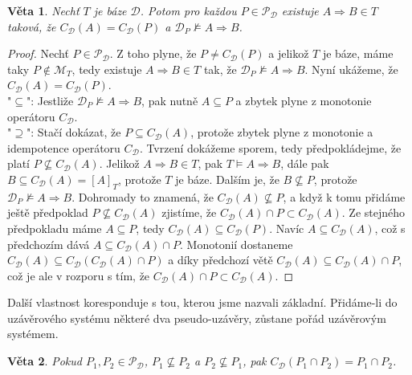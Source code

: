 \documentclass{article}
\newtheorem{theorem}{Věta}
\theoremstyle {definition}
\begin{document}
\begin{theorem}
  Nechť $T$ je báze $\mathcal{D}$. Potom pro každou $P \in \mathcal
  P_{\mathcal{D}}$ existuje $A \Rightarrow B \in T$ taková, že
  $C_{\mathcal{D}}(A) = C_{\mathcal{D}}(P)$ a $\mathcal{D}_P
  \not\models A \Rightarrow B$.
\end{theorem}
\begin{proof}
  Nechť $P \in \mathcal P_{\mathcal{D}}$. Z toho plyne, že $P \neq
  C_{\mathcal{D}}(P)$ a jelikož $T$ je báze, máme taky $P \not\in
  \mathcal{M}_T$, tedy existuje $A \Rightarrow B \in T$ tak, že
  $\mathcal{D}_P \not\models A \Rightarrow B$. Nyní ukážeme, že
  $C_{\mathcal{D}}(A) = C_{\mathcal{D}}(P)$. \\
  
  "$\subseteq$": Jestliže $\mathcal{D}_P \not\models A \Rightarrow B$,
  pak nutně $A\subseteq P$ a zbytek plyne z monotonie operátoru
  $C_{\mathcal{D}}$. \\

  "$\supseteq$": Stačí dokázat, že $P\subseteq C_{\mathcal D}(A)$,
  protože zbytek plyne z monotonie a idempotence operátoru
  $C_{\mathcal D}$. Tvrzení dokážeme sporem, tedy předpokládejme, že
  platí $P\not\subseteq C_{\mathcal D}(A)$. Jelikož $A\Rightarrow B\in
  T$, pak $T\models A\Rightarrow B$, dále pak $B\subseteq
  C_{\mathcal{D}}(A) = [A]_T$, protože $T$ je báze. Dalším je, že
  $B\not\subseteq P$, protože $\mathcal{D}_P \not\models A \Rightarrow
  B$. Dohromady to znamená, že $C_{\mathcal{D}}(A) \not\subseteq P$, a
  když k tomu přidáme ještě předpoklad $P\not\subseteq C_{\mathcal
    D}(A)$ zjistíme, že $C_{\mathcal D}(A) \cap P \subset C_{\mathcal
    D}(A)$. Ze stejného předpokladu máme $A\subseteq P$, tedy
  $C_{\mathcal D}(A)\subseteq C_{\mathcal D}(P)$. Navíc $A \subseteq
  C_{\mathcal D}(A)$, což s předchozím dává $A\subseteq C_{\mathcal
    D}(A) \cap P$. Monotonií dostaneme $C_{\mathcal D}(A)\subseteq
  C_{\mathcal D}(C_{\mathcal D}(A) \cap P)$ a díky předchozí větě
  $C_{\mathcal D}(A)\subseteq C_{\mathcal D}(A) \cap P$, což je ale v
  rozporu s tím, že $C_{\mathcal D}(A) \cap P \subset C_{\mathcal
    D}(A)$.
\end{proof}

Další vlastnost koresponduje s tou, kterou jsme nazvali
základní. Přidáme-li do uzávěrového systému některé dva
pseudo-uzávěry, zůstane pořád uzávěrovým systémem.

\begin{theorem}
  Pokud $P_1, P_2 \in \mathcal P_{\mathcal{D}}$, $P_1 \not\subseteq
  P_2$ a $P_2 \not\subseteq P_1$, pak $C_{\mathcal{D}} (P_1 \cap P_2)
  = P_1 \cap P_2$.
\end{theorem}
\end{document}
